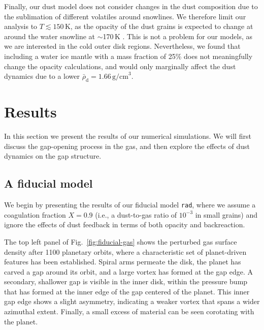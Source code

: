 \documentclass[fleqn,usenatbib,useAMS]{mnras}
\newcommand{\brhod}{\bar{\rho}_\mathrm{d}}
\begin{document}
Finally, our dust model does not consider changes in the dust composition due to the sublimation of different volatiles around snowlines. We therefore limit our analysis to $T\lesssim150$\,K, as the opacity of the dust grains is expected to change at around the water snowline at $\sim$170\,K \citep[e.g.,][]{lin-papaloizou-1985,bell-lin-1994}. This is not a problem for our models, as we are interested in the cold outer disk regions. Nevertheless, we found that including a water ice mantle with a mass fraction of 25\% does not meaningfully change the opacity calculations, and would only marginally affect the dust dynamics due to a lower $\brhod=1.66\,\text{g/cm}^3$.

\section{Results}
\label{sec:results}

In this section we present the results of our numerical simulations. We will first discuss the gap-opening process in the gas, and then explore the effects of dust dynamics on the gap structure.

\subsection{A fiducial model}

We begin by presenting the results of our fiducial model \texttt{rad}, where we assume a coagulation fraction $X=0.9$ (i.e., a dust-to-gas ratio of $10^{-3}$ in small grains) and ignore the effects of dust feedback in terms of both opacity and backreaction.

The top left panel of Fig.~\ref{fig:fiducial-gas} shows the perturbed gas surface density after 1100 planetary orbits, where a characteristic set of planet-driven features has been established. Spiral arms permeate the disk, the planet has carved a gap around its orbit, and a large vortex has formed at the gap edge. A secondary, shallower gap is visible in the inner disk, within the pressure bump that has formed at the inner edge of the gap centered of the planet. This inner gap edge shows a slight asymmetry, indicating a weaker vortex that spans a wider azimuthal extent. Finally, a small excess of material can be seen corotating with the planet.
\end{document}
